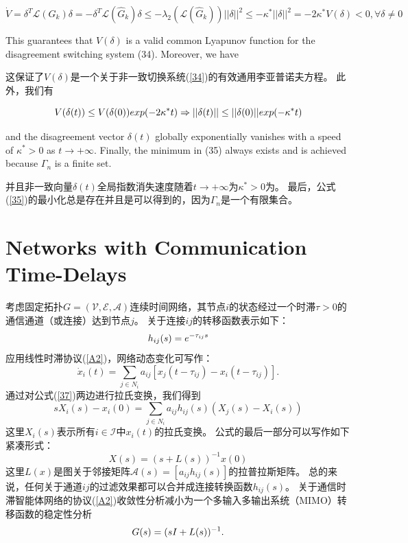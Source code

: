 \documentclass{article}
\begin{document}
\begin{equation}
    \tag{36}
    \label{36}
    \dot{V} = \delta^T\mathcal{L}(G_k)\delta = -\delta^T\mathcal{L}(\hat{G}_k)\delta \le -\lambda_2(\mathcal{L}(\hat{G}_k))||\delta||^2 \le -\kappa^*||\delta||^2 = -2\kappa^*V(\delta)<0,\forall \delta \ne 0
\end{equation}

{\color[gray]{0.5}
\noindent This guarantees that $V(\delta)$ is a valid common Lyapunov function for the disagreement switching system (34). 
Moreover, we have
}

\noindent 这保证了$V(\delta)$是一个关于非一致切换系统(\ref{34})的有效通用李亚普诺夫方程。
此外，我们有

\begin{equation}
    \notag
    V(\delta(t)) \le V(\delta(0))exp(-2\kappa^*t) \Rightarrow ||\delta(t)|| \le ||\delta(0)||exp(-\kappa^*t)
\end{equation}

{\color[gray]{0.5}
\noindent and the disagreement vector $\delta(t)$ globally exponentially vanishes with a speed of $\kappa^* > 0$ as $t\rightarrow +\infty$. 
Finally, the minimum in (35) always exists and is achieved because $\Gamma_n$ is a ﬁnite set.
}

\noindent 并且非一致向量$\delta(t)$全局指数消失速度随着$t\rightarrow +\infty$为$\kappa^* > 0$为。
最后，公式(\ref{35})的最小化总是存在并且是可以得到的，因为$\Gamma_n$是一个有限集合。

\section{Networks with Communication Time-Delays}
考虑固定拓扑$G=(\mathcal{V}, \mathcal{E}, \mathcal{A})$连续时间网络，其节点$i$的状态经过一个时滞$\tau > 0$的通信通道（或连接）达到节点$j$。
关于连接$ij$的转移函数表示如下：
\begin{equation}
    h_{ij}(s) = e^{-\tau_{ij}s}
    \notag
\end{equation}
应用线性时滞协议(\ref{A2})，网络动态变化可写作：
\begin{equation}
    \dot{x}_i(t) = \sum_{j\in N_i} a_{ij} [x_j(t-\tau_{ij}) - x_i(t-\tau_{ij})].
    \tag{37}
    \label{37}
\end{equation}
通过对公式(\ref{37})两边进行拉氏变换，我们得到
\begin{equation}
    sX_i(s) - x_i(0) = \sum_{j\in N_i} a_{ij} h_{ij}(s) (X_j(s) - X_i(s))
    \tag{38}
    \label{38}
\end{equation}
这里$X_i(s)$表示所有$i\in \mathcal{I}$中$x_i(t)$的拉氏变换。
公式的最后一部分可以写作如下紧凑形式：
\begin{equation}
    X(s) = (s+L(s))^{-1}x(0)
    \tag{39}
    \label{39}
\end{equation}
这里$L(x)$是图关于邻接矩阵$\mathcal{A}(s) = [a_{ij}h_{ij}(s)]$的拉普拉斯矩阵。
总的来说，任何关于通道$ij$的过滤效果都可以合并成连接转换函数$h_{ij}(s)$。
关于通信时滞智能体网络的协议(\ref{A2})收敛性分析减小为一个多输入多输出系统（MIMO）转移函数的稳定性分析
\begin{equation}
    G(s) = (sI+L(s))^{-1}.
    \notag
\end{equation}
\end{document}
